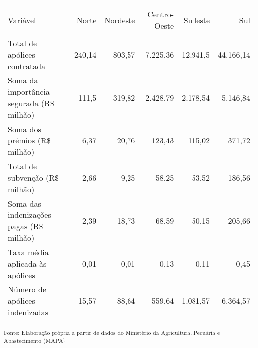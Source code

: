 \begin{center}
\footnotesize
    \begin{tabular}{lrrrrr}
    \hline \\[-1.9ex]	
    Variável                                  & Norte   & Nordeste & Centro-Oeste & Sudeste  & Sul       \\
    \hline \\[-1.9ex]	
    Total de apólices contratada              &  240,14 &   803,57 &      7.225,36 &  12.941,5 &  44.166,14 \\
    Soma da importância segurada (R\$ milhão) &   111,5 &   319,82 &      2.428,79 &  2.178,54 &   5.146,84 \\
    Soma dos prêmios (R\$ milhão)             &    6,37 &    20,76 &       123,43 &   115,02 &    371,72 \\
    Total de subvenção (R\$ milhão)           &    2,66 &     9,25 &        58,25 &    53,52 &    186,56 \\
    Soma das indenizações pagas (R\$ milhão)  &    2,39 &    18,73 &        68,59 &    50,15 &    205,66 \\
    Taxa média aplicada às apólices           &    0,01 &     0,01 &         0,13 &     0,11 &      0,45 \\
    Número de apólices indenizadas            &   15,57 &    88,64 &       559,64 &  1.081,57 &   6.364,57 \\
    \hline 
    \end{tabular}
\end{center}
\small \textsuperscript {Fonte: Elaboração própria a partir de dados do Ministério da Agricultura, Pecuária e Abastecimento (MAPA)}\\

